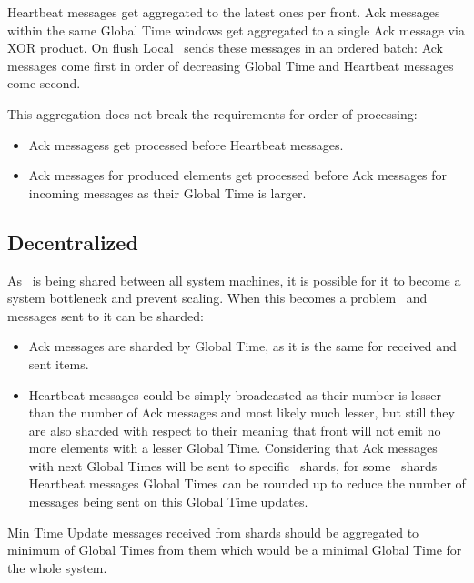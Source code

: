 Heartbeat messages get aggregated to the latest ones per front. Ack messages within the same Global Time windows  get aggregated to a single Ack message via XOR product. On flush Local \tracker\ sends these messages in an ordered batch: Ack messages come first in order of decreasing Global Time and Heartbeat messages come second.

This aggregation does not break the requirements for order of processing:
\begin{itemize}
	\item Ack messagess get processed before Heartbeat messages.
	\item Ack messages for produced elements get processed before Ack messages for incoming messages as their Global Time is larger.
\end{itemize}

\subsection{Decentralized \tracker\ }

As \tracker\ is being shared between all system machines, it is possible for it to become a system bottleneck and prevent scaling. When this becomes a problem \tracker\ and messages sent to it can be sharded:
\begin{itemize}
	\item Ack messages are sharded by Global Time, as it is the same for received and sent items.
	\item Heartbeat messages could be simply broadcasted as their number is lesser than the number of Ack messages and most likely much lesser, but still they are also sharded with respect to their meaning that  front will not emit no more elements with a lesser Global Time. Considering that Ack messages with next Global Times will be sent to specific \tracker\ shards, for some \tracker\ shards Heartbeat messages Global Times can be rounded up to reduce the number of messages being sent on this Global Time updates.
\end{itemize}

Min Time Update messages received from shards should be aggregated to minimum of Global Times from them which would be a minimal Global Time for the whole system.

